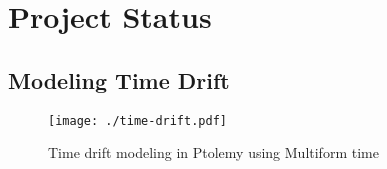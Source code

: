 \section{Project Status}
\label{sec:project-status}

\subsection{Modeling Time Drift}
\label{sec:modeling-time-drift}

\begin{figure}
  \centering
  \texttt{[image: ./time-drift.pdf]}
  \caption{Time drift modeling in Ptolemy using Multiform time}
  \label{fig:time}
\end{figure}


